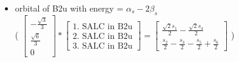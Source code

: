 \documentclass[12pt,a4paper]{article}
\begin{document}
\begin{itemize}
                            ( $\left[\begin{matrix}1\end{matrix}\right] * \left[\begin{array}{c}\text{1. SALC in B1g}\end{array}\right] = \left[\begin{matrix}\frac{s_{2}}{2} - \frac{s_{3}}{2} + \frac{s_{5}}{2} - \frac{s_{6}}{2}\end{matrix}\right] $ )
\item orbital of B2u with energy = $\alpha_{s} - 2 \beta_{s}$ \\
                            ( $\left[\begin{matrix}- \frac{\sqrt{3}}{3}\\\frac{\sqrt{6}}{3}\\0\end{matrix}\right] * \left[\begin{array}{c}\text{1. SALC in B2u} \\ \text{2. SALC in B2u} \\ \text{3. SALC in B2u}\end{array}\right] = \left[\begin{matrix}\frac{\sqrt{2} s_{1}}{2} - \frac{\sqrt{2} s_{4}}{2}\\\frac{s_{2}}{2} - \frac{s_{3}}{2} - \frac{s_{5}}{2} + \frac{s_{6}}{2}\end{matrix}\right] $ )
\end{itemize}
\end{document}
